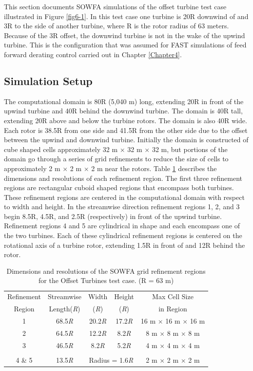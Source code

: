 This section documents SOWFA simulations of the offset turbine test case illustrated in Figure \ref{fig6-1}. In this test case one turbine is 20R downwind of and 3R to the side of another turbine, where R is the rotor radius of 63 meters. Because of the 3R offset, the downwind turbine is not in the wake of the upwind turbine. This is the configuration that was assumed for FAST simulations of feed forward derating control carried out in Chapter \ref{Chapter4}. 


\subsection{Simulation Setup} \label{section6-6-1}

The computational domain is 80R (5,040 m) long, extending 20R in front of the upwind turbine and 40R behind the downwind turbine. The domain is 40R tall, extending 20R above and below the turbine rotors. The domain is also 40R wide. Each rotor is 38.5R from one side and 41.5R from the other side due to the offset between the upwind and downwind turbine. Initially the domain is constructed of cube shaped cells approximately 32 m $\times$ 32 m $\times$ 32 m, but portions of the domain go through a series of grid refinements to reduce the size of cells to approximately 2 m $\times$ 2 m $\times$ 2 m near the rotors. Table \ref{Table6-1} describes the dimensions and resolutions of each refinement region. The first three refinement regions are rectangular cuboid shaped regions that encompass both turbines. These refinement regions are centered in the computational domain with respect to width and height. In the streamwise direction refinement regions 1, 2, and 3 begin 8.5R, 4.5R, and 2.5R (respectively) in front of the upwind turbine. Refinement regions 4 and 5 are cylindrical in shape and each encompass one of the two turbines. Each of these cylindrical refinement regions is centered on the rotational axis of a turbine rotor, extending 1.5R in front of and 12R behind the rotor.


\begin{table} [ht]
\centering
\begin{tabular}{c c c c c}
\hline
Refinement & Streamwise  & Width & Height & Max Cell Size\\
Region & Length(\emph{R}) & (\emph{R})  &  (\emph{R}) & in Region\\
\hline
1 & 68.5\emph{R}  & 20.2\emph{R} & 17.2\emph{R} & 16 m $\times$ 16 m $\times$ 16 m\\
2 & 64.5\emph{R}  & 12.2\emph{R} & 8.2\emph{R}  & 8 m $\times$ 8 m $\times$ 8 m\\
3 & 46.5\emph{R}  & 8.2\emph{R} & 5.2\emph{R}  & 4 m $\times$ 4 m $\times$ 4 m\\
\\
4 \& 5 & 13.5\emph{R}    & \multicolumn{2}{c}{Radius = 1.6\emph{R}}   & 2 m $\times$ 2 m $\times$ 2 m\\
\hline
\end{tabular}
\caption{ Dimensions and resolutions of the SOWFA grid refinement regions for the Offset Turbines test case. (R = 63 m)}
\label{Table6-1}
\end{table}


